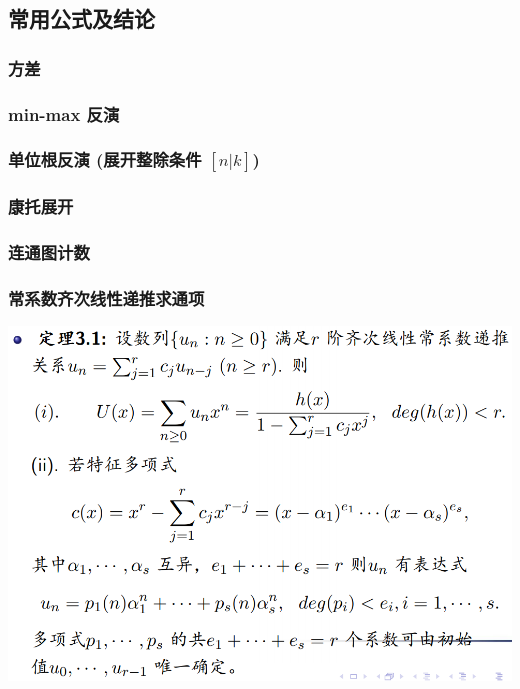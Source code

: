 \documentclass[a4paper, twoside]{article}
\begin{document}
\begin{multicols}{2}
			\subsection{常用公式及结论}
				\subsubsection{方差}
					
				
				\subsubsection{min-max 反演}
					
				
				\subsubsection{单位根反演 (展开整除条件 $[n|k]$)}
					
				
				\subsubsection[康托展开 (排列的排名)]{康托展开}
					
				
				\subsubsection{连通图计数}
					

				\subsubsection{常系数齐次线性递推求通项}
					\includegraphics[scale = 0.265]{../src/math/线性齐次线性常系数递推.png}
			

\end{multicols}
\end{document}
